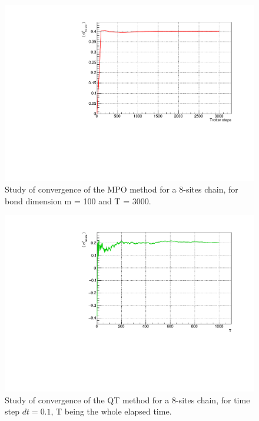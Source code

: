\begin{figure}[H]
    \label{fig:convergence_mpo_8sites}
    \centering
    \includegraphics[scale=0.7]{Figures/convergence/Convergence_s8T3000J1051.pdf}
    \caption{Study of convergence of the MPO method for a 8-sites chain, for bond dimension m = 100 and T = 3000.}
    \label{fig:convergenceMPO_8sites}
\end{figure}

\begin{figure}[H]
    \label{fig:convergence_mpo_8sites}
    \centering
    \includegraphics[scale=0.7]{Figures/convergence/Convergence_s8J10505.pdf}
    \caption{Study of convergence of the QT method for a 8-sites chain, for time step $dt=0.1$, T being the whole elapsed time.}
    \label{fig:convergenceMPO_8sites}
\end{figure}

